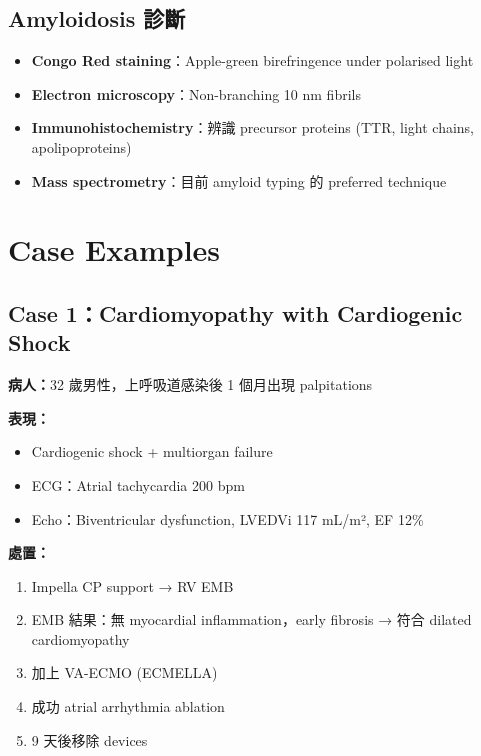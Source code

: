 \documentclass[12pt,a4paper]{article}
\begin{document}
\subsection{Amyloidosis 診斷}

\begin{itemize}
    \item \textbf{Congo Red staining}：Apple-green birefringence under polarised light
    \item \textbf{Electron microscopy}：Non-branching 10 nm fibrils
    \item \textbf{Immunohistochemistry}：辨識 precursor proteins (TTR, light chains, apolipoproteins)
    \item \textbf{Mass spectrometry}：目前 amyloid typing 的 preferred technique
\end{itemize}


\section{Case Examples}

\subsection{Case 1：Cardiomyopathy with Cardiogenic Shock}

\textbf{病人：}32 歲男性，上呼吸道感染後 1 個月出現 palpitations

\textbf{表現：}
\begin{itemize}
    \item Cardiogenic shock + multiorgan failure
    \item ECG：Atrial tachycardia 200 bpm
    \item Echo：Biventricular dysfunction, LVEDVi 117 mL/m², EF 12\%
\end{itemize}

\textbf{處置：}
\begin{enumerate}
    \item Impella CP support → RV EMB
    \item EMB 結果：無 myocardial inflammation，early fibrosis → 符合 dilated cardiomyopathy
    \item 加上 VA-ECMO (ECMELLA)
    \item 成功 atrial arrhythmia ablation
    \item 9 天後移除 devices
\end{enumerate}
\end{document}
